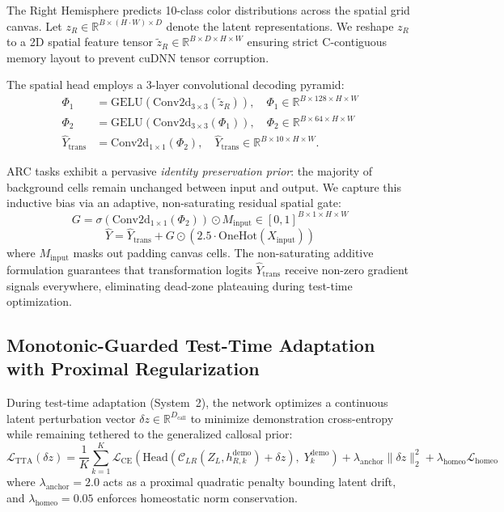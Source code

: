 \documentclass[11pt,a4paper]{article}
\theoremstyle{plain}
\theoremstyle{definition}
\theoremstyle{remark}
\newcommand{\CC}{\mathcal{C}_{LR}}
\begin{document}
The Right Hemisphere predicts 10-class color distributions across the spatial grid canvas. Let $z_R \in \mathbb{R}^{B \times (H \cdot W) \times D}$ denote the latent representations. We reshape $z_R$ to a 2D spatial feature tensor $\tilde{z}_R \in \mathbb{R}^{B \times D \times H \times W}$ ensuring strict C-contiguous memory layout to prevent cuDNN tensor corruption.

The spatial head employs a 3-layer convolutional decoding pyramid:
\begin{align}
    \Phi_1 &= \mathrm{GELU}(\mathrm{Conv2d}_{3 \times 3}(\tilde{z}_R)), \quad \Phi_1 \in \mathbb{R}^{B \times 128 \times H \times W} \\
    \Phi_2 &= \mathrm{GELU}(\mathrm{Conv2d}_{3 \times 3}(\Phi_1)), \quad \Phi_2 \in \mathbb{R}^{B \times 64 \times H \times W} \\
    \hat{Y}_{\mathrm{trans}} &= \mathrm{Conv2d}_{1 \times 1}(\Phi_2), \quad \hat{Y}_{\mathrm{trans}} \in \mathbb{R}^{B \times 10 \times H \times W}.
\end{align}

ARC tasks exhibit a pervasive \emph{identity preservation prior}: the majority of background cells remain unchanged between input and output. We capture this inductive bias via an adaptive, non-saturating residual spatial gate:
\begin{equation}
    G = \sigma\left(\mathrm{Conv2d}_{1 \times 1}(\Phi_2)\right) \odot M_{\mathrm{input}} \in [0, 1]^{B \times 1 \times H \times W}
\end{equation}
\begin{equation}
    \hat{Y} = \hat{Y}_{\mathrm{trans}} + G \odot \left( 2.5 \cdot \mathrm{OneHot}(X_{\mathrm{input}}) \right)
\end{equation}
where $M_{\mathrm{input}}$ masks out padding canvas cells. The non-saturating additive formulation guarantees that transformation logits $\hat{Y}_{\mathrm{trans}}$ receive non-zero gradient signals everywhere, eliminating dead-zone plateauing during test-time optimization.

\subsection{Monotonic-Guarded Test-Time Adaptation with Proximal Regularization}

During test-time adaptation (System~2), the network optimizes a continuous latent perturbation vector $\delta z \in \mathbb{R}^{D_{\mathrm{call}}}$ to minimize demonstration cross-entropy while remaining tethered to the generalized callosal prior:
\begin{equation}
    \mathcal{L}_{\mathrm{TTA}}(\delta z) = \frac{1}{K} \sum_{k=1}^K \mathcal{L}_{\mathrm{CE}}\left(\mathrm{Head}\left(\CC\left(Z_L, h_{R, k}^{\mathrm{demo}}\right) + \delta z\right), \; Y_k^{\mathrm{demo}}\right) + \lambda_{\mathrm{anchor}} \|\delta z\|_2^2 + \lambda_{\mathrm{homeo}} \mathcal{L}_{\mathrm{homeo}}
\end{equation}
where $\lambda_{\mathrm{anchor}} = 2.0$ acts as a proximal quadratic penalty bounding latent drift, and $\lambda_{\mathrm{homeo}} = 0.05$ enforces homeostatic norm conservation. 
\end{document}
